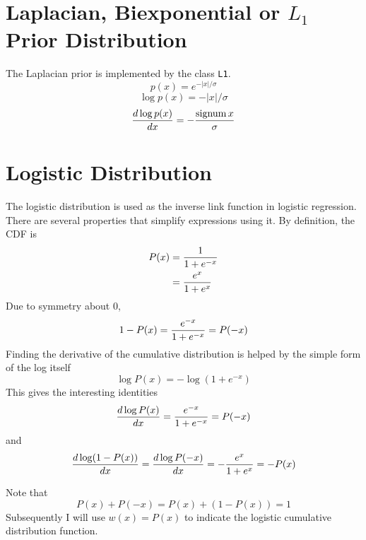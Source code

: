 \documentclass[11pt]{article}
\begin{document}
\section{Laplacian, Biexponential or $L_1$ Prior Distribution}
The Laplacian prior is implemented by the class {\tt L1}.
\begin{equation*}
p(x) = e^{-|x|/\sigma}
\end{equation*}
\begin{equation*}
\log p(x) = {-|x|/\sigma}
\end{equation*}
\begin{equation*}
{d \log p(x) \over dx} = -{\mathrm {signum} \,x \over \sigma}
\end{equation*}

\section{Logistic Distribution}
The logistic distribution is used as the inverse link function in logistic regression.  There are several properties that simplify expressions using it.
By definition, the CDF is
\begin{align*}
P(x) &= {1 \over 1+e^{-x}} \\
&= {e^x \over 1+e^x}
\end{align*}
Due to symmetry about $0$,
\begin{equation*}
1-P(x) = {e^{-x} \over 1+e^{-x}} = P(-x) 
\end{equation*}
Finding the derivative of the cumulative distribution is helped by the simple form of the log itself
\begin{equation*}
\log P(x) = -\log (1+e^{-x}) 
\end{equation*}
This gives the interesting identities
\begin{equation*}
{d \log P(x)\over dx} = {e^{-x} \over 1+e^{-x}} = P(-x)
\end{equation*}
and
\begin{equation*}
{d \log (1-P(x))\over dx} = {d \log P(-x) \over d x}= - {e^x \over 1+e^x} = -P(x)
\end{equation*}

Note that 
\begin{equation*}
P(x) + P(-x) = P(x) + (1-P(x))=1
\end{equation*}
Subsequently I will use $w(x) = P(x)$ to indicate the logistic cumulative distribution function.
\end{document}
